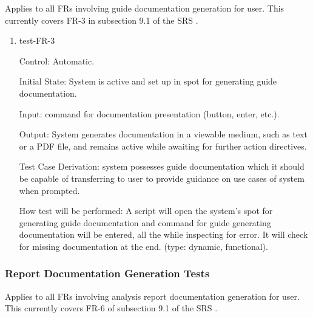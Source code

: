 \documentclass[12pt, titlepage]{article}
\begin{document}
Applies to all FRs involving guide documentation generation for user. This 
currently covers FR-3 in subsection 9.1 of the SRS \citep{SRS}.

\begin{enumerate}

\item{test-FR-3\\}

Control: Automatic.
					
Initial State: System is active and set up in spot for generating guide 
documentation.
					
Input: command for documentation presentation (button, enter, etc.).
					
Output: System generates documentation in a viewable medium, such as text or a 
PDF file, and remains active while awaiting for further action directives.

Test Case Derivation: system possesses guide documentation which it should be 
capable of transferring to user to provide guidance on use cases of system 
when prompted.

How test will be performed: A script will open the system's spot for generating 
guide documentation and command for guide generating documentation will be 
entered, all the while inspecting for error. It will check for missing 
documentation at the end. (type: dynamic, functional).				

\end{enumerate}

\subsubsection{Report Documentation Generation Tests}

Applies to all FRs involving analysis report documentation generation for 
user. This currently covers FR-6 of subsection 9.1 of the SRS \citep{SRS}.
\end{document}
